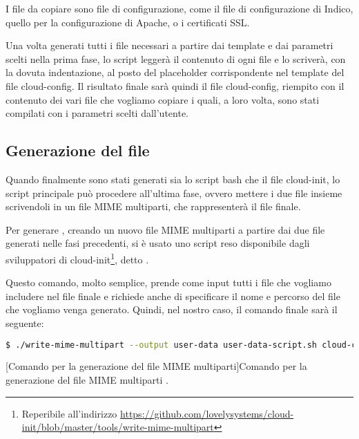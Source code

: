             I file da copiare sono file di configurazione, come il file di configurazione di Indico, quello per la configurazione di Apache, o i certificati \ac{SSL}.
            
            Una volta generati tutti i file necessari a partire dai template e dai parametri scelti nella prima fase, lo script leggerà il contenuto di ogni file e lo scriverà, con la dovuta indentazione, al posto del placeholder corrispondente nel template del file cloud-config. Il risultato finale sarà quindi il file cloud-config, riempito con il contenuto dei vari file che vogliamo copiare i quali, a loro volta, sono stati compilati con i parametri scelti dall'utente.
        
        \subsection{Generazione del file } \label{subsec:cd;dci;generazione_user-data}
        
            Quando finalmente sono stati generati sia lo script bash che il file cloud-init, lo script principale può procedere all'ultima fase, ovvero mettere i due file insieme scrivendoli in un file \ac{MIME} multiparti, che rappresenterà il file  finale.
            
            Per generare , creando un nuovo file \ac{MIME} multiparti a partire dai due file generati nelle fasi precedenti, si è usato uno script reso disponibile dagli sviluppatori di cloud-init\footnote{Reperibile all'indirizzo \url{https://github.com/lovelysystems/cloud-init/blob/master/tools/write-mime-multipart}}, detto .
            
            Questo comando, molto semplice, prende come input tutti i file che vogliamo includere nel file finale e richiede anche di specificare il nome e percorso del file che vogliamo venga generato. Quindi, nel nostro caso, il comando finale sarà il seguente:
            
            \begin{center}
                \begin{lstlisting}[language=bash, gobble=18]
                    $ ./write-mime-multipart --output user-data user-data-script.sh cloud-config
                \end{lstlisting}
                \captionsetup{textformat=empty,labelformat=empty} \vspace{-2em}
                [Comando per la generazione del file MIME multiparti]{Comando per la generazione del file \ac{MIME} multiparti .}
            \end{center}
            

